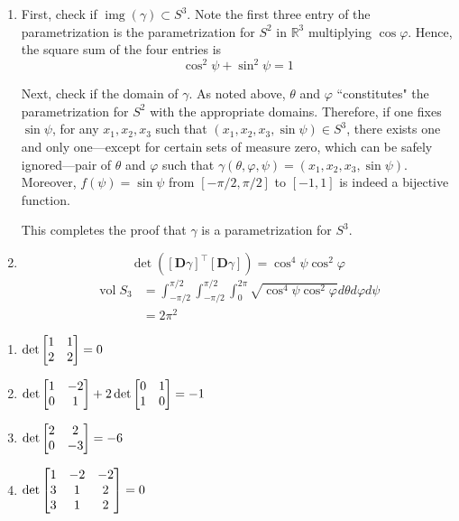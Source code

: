 \documentclass{homework}
\DeclareMathOperator{\img}{img}
\DeclareMathOperator{\vol}{vol}
\begin{document}
\begin{problem}{7}
\begin{enumerate}
\item
First, check if $\img(\gamma) \subset S^3$. Note the first three entry of the
parametrization is the parametrization for $S^2$ in $\mathbb{R}^3$ multiplying
$\cos\varphi$. Hence, the square sum of the four entries is
$$\cos^2\psi + \sin^2\psi = 1$$

Next, check if the domain of $\gamma$. As noted above, $\theta$ and $\varphi$
``constitutes" the parametrization for $S^2$ with the appropriate domains.
Therefore, if one fixes $\sin\psi$, for any $x_1,x_2,x_3$ such that
$(x_1,x_2,x_3,\sin\psi)\in S^3$, there exists one and only one---except for
certain sets of measure zero, which can be safely ignored---pair of
$\theta$ and $\varphi$ such that
$\gamma(\theta,\varphi,\psi)=(x_1,x_2,x_3,\sin\psi)$. Moreover,
$f(\psi)=\sin\psi$ from $[-\pi/2,\pi/2]$ to $[-1,1]$ is indeed a bijective
function.

This completes the proof that $\gamma$ is a parametrization for $S^3$. \QED
\item
$$\det([\mathbf{D}\gamma]^{\top}[\mathbf{D}\gamma]) = \cos^4\psi\cos^2\varphi$$
\begin{align*}
\vol{S_3} &=
\int_{-\pi/2}^{\pi/2}\int_{-\pi/2}^{\pi/2}\int_{0}^{2\pi}
\sqrt{\cos^4\psi\cos^2\varphi}d\theta d\varphi d\psi \\ &= 2\pi^2
\end{align*}
\end{enumerate}
\end{problem}

\begin{problem}{8}
\begin{enumerate}
\item $\det\begin{bmatrix}1&1\\2&2\end{bmatrix}=0$
\item $\det\begin{bmatrix}1&-2\\0&1\end{bmatrix}+2\det\begin{bmatrix}0&1\\1&0\end{bmatrix}=-1$
\item $\det\begin{bmatrix}2&2\\0&-3\end{bmatrix}=-6$
\item $\det\begin{bmatrix}1&-2&-2\\3&1&2\\3&1&2\end{bmatrix}=0$
\end{enumerate}
\end{problem}
\end{document}
